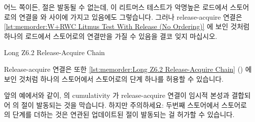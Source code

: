 어느 쪽이든,  절은 발동될 수 없는데, 이 리트머스 테스트가 악명높은
로드에서 스토어로의 연결을  와  사이에 가지고 있음에도
그렇습니다.
그러나 release-acquire 연결은
\cref{lst:memorder:W+RWC Litmus Test With Release (No Ordering)} 에 보인 것처럼
하나의 로드에서 스토어로의 연결만을 가질 수 있음을 결코 잊지 마십시오.

\begin{listing}[tbp]

\caption{Long Z6.2 Release-Acquire Chain}
\label{lst:memorder:Long Z6.2 Release-Acquire Chain}
\end{listing}

Release-acquire 연결은 또한
\cref{lst:memorder:Long Z6.2 Release-Acquire Chain}
() 에 보인 것처럼 하나의 스토어에서
스토어로의 단계 하나를 허용할 수 있습니다.
\begin{fcvref}
앞의 예에서와 같이,  의 cumulativity 가 release-acquire
연결이 임시적 본성과 결합되어  의  절이 발동되는 것을
막습니다.
하지만 주의하세요: 두번째 스토어에서 스토어로의 단계를 더하는 것은 연관된
업데이트된  절이 발동되는 걸 허가할 수 있습니다.
\end{fcvref}


